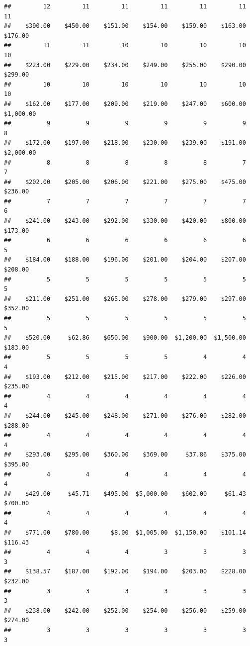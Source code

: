 \begin{verbatim}
##         12         11         11         11         11         11         11 
##    $390.00    $450.00    $151.00    $154.00    $159.00    $163.00    $176.00 
##         11         11         10         10         10         10         10 
##    $223.00    $229.00    $234.00    $249.00    $255.00    $290.00    $299.00 
##         10         10         10         10         10         10         10 
##    $162.00    $177.00    $209.00    $219.00    $247.00    $600.00  $1,000.00 
##          9          9          9          9          9          9          8 
##    $172.00    $197.00    $218.00    $230.00    $239.00    $191.00  $2,000.00 
##          8          8          8          8          8          7          7 
##    $202.00    $205.00    $206.00    $221.00    $275.00    $475.00    $236.00 
##          7          7          7          7          7          7          6 
##    $241.00    $243.00    $292.00    $330.00    $420.00    $800.00    $173.00 
##          6          6          6          6          6          6          5 
##    $184.00    $188.00    $196.00    $201.00    $204.00    $207.00    $208.00 
##          5          5          5          5          5          5          5 
##    $211.00    $251.00    $265.00    $278.00    $279.00    $297.00    $352.00 
##          5          5          5          5          5          5          5 
##    $520.00     $62.86    $650.00    $900.00  $1,200.00  $1,500.00    $183.00 
##          5          5          5          5          4          4          4 
##    $193.00    $212.00    $215.00    $217.00    $222.00    $226.00    $235.00 
##          4          4          4          4          4          4          4 
##    $244.00    $245.00    $248.00    $271.00    $276.00    $282.00    $288.00 
##          4          4          4          4          4          4          4 
##    $293.00    $295.00    $360.00    $369.00     $37.86    $375.00    $395.00 
##          4          4          4          4          4          4          4 
##    $429.00     $45.71    $495.00  $5,000.00    $602.00     $61.43    $700.00 
##          4          4          4          4          4          4          4 
##    $771.00    $780.00      $8.00  $1,005.00  $1,150.00    $101.14    $116.43 
##          4          4          4          3          3          3          3 
##    $138.57    $187.00    $192.00    $194.00    $203.00    $228.00    $232.00 
##          3          3          3          3          3          3          3 
##    $238.00    $242.00    $252.00    $254.00    $256.00    $259.00    $274.00 
##          3          3          3          3          3          3          3 

\end{verbatim}
